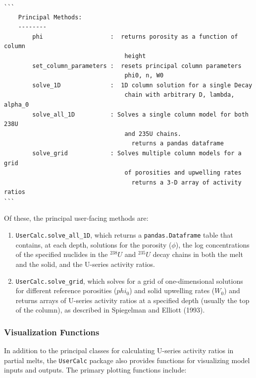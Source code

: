 \documentclass[draft]{agujournal2019}
\begin{document}
\sffamily
\color{purple}
\begin{verbatim}
```
    Principal Methods:
    --------
        phi                   :  returns porosity as a function of column 
                                  height
        set_column_parameters :  resets principal column parameters 
                                  phi0, n, W0
        solve_1D              :  1D column solution for a single Decay 
                                  chain with arbitrary D, lambda, alpha_0
        solve_all_1D          : Solves a single column model for both 238U
                                  and 235U chains.  
                                    returns a pandas dataframe
        solve_grid            : Solves multiple column models for a grid 
                                  of porosities and upwelling rates
                                    returns a 3-D array of activity ratios    
```
\end{verbatim}

\color{black}
\normalfont
Of these,  the principal user-facing methods are:

\begin{enumerate}
	\item \colorbox{gray!20}{\texttt{UserCalc.solve\_all\_1D}}, which returns a \colorbox{gray!20}{\texttt{pandas.Dataframe}} table that contains, at each depth, solutions for the porosity ($\phi$), the log concentrations of the specified nuclides in the $^{238}U$ and $^{235}U$ decay chains in both the melt and the solid, and the U-series activity ratios.
	\item \colorbox{gray!20}{\texttt{UserCalc.solve\_grid}}, which solves for a grid of one-dimensional solutions for different reference porosities ($phi_0$) and solid upwelling rates ($W_0$) and returns arrays of U-series activity ratios at a specified depth (usually the top of the column), as described in Spiegelman and Elliott (1993).
\end{enumerate}


\subsubsection{Visualization Functions}

In addition to the principal classes for calculating U-series activity ratios in partial melts, the \colorbox{gray!20}{\texttt{UserCalc}} package also provides functions for visualizing model inputs and outputs. The primary plotting functions include:
\end{document}
